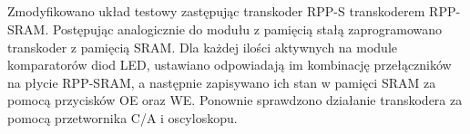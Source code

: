 \subsection{}
Zmodyfikowano układ testowy zastępując transkoder RPP-S transkoderem RPP-SRAM.
Postępując analogicznie do modułu z pamięcią stałą zaprogramowano transkoder z pamięcią SRAM.
Dla każdej ilości aktywnych na module komparatorów diod LED, ustawiano odpowiadają im kombinację przełączników na płycie RPP-SRAM, a następnie zapisywano ich stan w pamięci SRAM za pomocą przycisków OE oraz WE.
Ponownie sprawdzono działanie transkodera za pomocą przetwornika C/A i oscyloskopu.